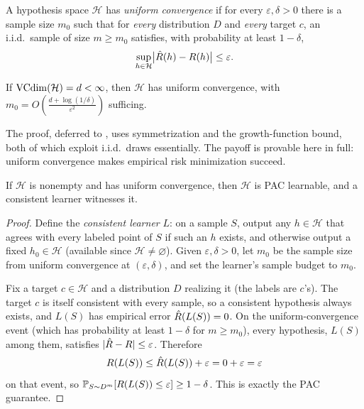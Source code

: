 \begin{defn}
\label{def:uc}
A hypothesis space $\mathcal{H}$ has \emph{uniform convergence} if for every $\varepsilon, \delta > 0$ there is a sample size $m_0$ such that for \emph{every} distribution $D$ and \emph{every} target $c$, an i.i.d.\ sample of size $m \geq m_0$ satisfies, with probability at least $1 - \delta$,
\[
\sup_{h \in \mathcal{H}} \bigl|\hat{R}(h) - R(h)\bigr| \leq \varepsilon.
\]
\end{defn}

\begin{thm}
\label{thm:uc-vc}
If $\mathrm{VCdim}(\mathcal{H}) = d < \infty$, then $\mathcal{H}$ has uniform convergence, with $m_0 = O\!\left(\frac{d + \log(1/\delta)}{\varepsilon^2}\right)$ sufficing.
\end{thm}

The proof, deferred to , uses symmetrization and the growth-function bound, both of which exploit i.i.d.\ draws essentially. The payoff is provable here in full: uniform convergence makes empirical risk minimization succeed.

\begin{thm}
\label{thm:uc-pac}
If $\mathcal{H}$ is nonempty and has uniform convergence, then $\mathcal{H}$ is PAC learnable, and a consistent learner witnesses it.
\end{thm}

\begin{proof}
Define the \emph{consistent learner} $L$: on a sample $S$, output any $h \in \mathcal{H}$ that agrees with every labeled point of $S$ if such an $h$ exists, and otherwise output a fixed $h_0 \in \mathcal{H}$ (available since $\mathcal{H} \neq \varnothing$). Given $\varepsilon, \delta > 0$, let $m_0$ be the sample size from uniform convergence at $(\varepsilon, \delta)$, and set the learner's sample budget to $m_0$.

Fix a target $c \in \mathcal{H}$ and a distribution $D$ realizing it (the labels are $c$'s). The target $c$ is itself consistent with every sample, so a consistent hypothesis always exists, and $L(S)$ has empirical error $\hat{R}(L(S)) = 0$. On the uniform-convergence event (which has probability at least $1 - \delta$ for $m \geq m_0$), every hypothesis, $L(S)$ among them, satisfies $|\hat{R} - R| \leq \varepsilon$. Therefore
\[
R(L(S)) \leq \hat{R}(L(S)) + \varepsilon = 0 + \varepsilon = \varepsilon
\]
on that event, so $\mathbb{P}_{S \sim D^{m}}[R(L(S)) \leq \varepsilon] \geq 1 - \delta$. This is exactly the PAC guarantee.
\end{proof}

